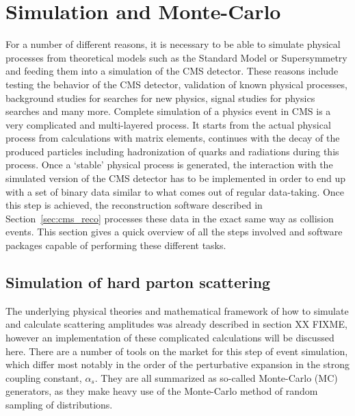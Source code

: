\section{Simulation and Monte-Carlo}
\label{sec:cms_mc}
For a number of different reasons, it is necessary to be able to simulate physical processes from theoretical models such as the Standard Model or Supersymmetry and feeding them into
a simulation of the CMS detector.
These reasons include testing the behavior of the CMS detector, validation of known physical processes, background studies for searches for new physics, signal studies for physics searches
and many more. 
Complete simulation of a physics event in CMS is a very complicated and multi-layered process. It starts from the actual physical process from calculations with matrix elements, 
continues with the decay of the produced particles including hadronization of quarks and radiations during this process. Once a `stable' physical process is generated, the interaction
with the simulated version of the CMS detector has to be implemented in order to end up with a set of binary data similar to what comes out of regular data-taking. Once this step is 
achieved, the reconstruction software described in Section~\ref{sec:cms_reco} processes these data in the exact same way as collision events. This section gives a quick overview of 
all the steps involved and software packages capable of performing these different tasks.

\subsection{Simulation of hard parton scattering}
\label{sub:hard}
The underlying physical theories and mathematical framework of how to simulate and calculate scattering amplitudes was already described in section XX FIXME, however an implementation
of these complicated calculations will be discussed here. There are a number of tools on the market for this step of event simulation, which differ most notably in the order
of the perturbative expansion in the strong coupling constant, $\alpha_s$. They are all summarized as so-called Monte-Carlo (MC) generators, as they make heavy use of the Monte-Carlo method
of random sampling of distributions.

